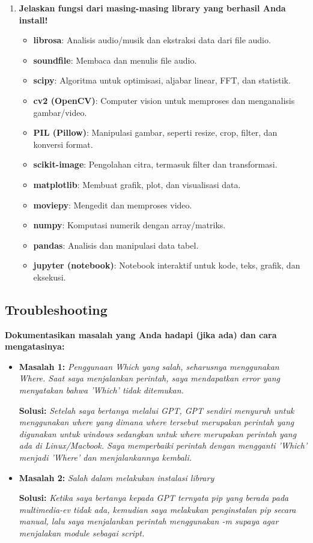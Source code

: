\documentclass[11pt,a4paper]{article}
\begin{document}
\begin{enumerate}
    \item \textbf{Jelaskan fungsi dari masing-masing library yang berhasil Anda install!}
    \begin{itemize}
    \item \textbf{librosa}: Analisis audio/musik dan ekstraksi data dari file audio.
    \item \textbf{soundfile}: Membaca dan menulis file audio.
    \item \textbf{scipy}: Algoritma untuk optimisasi, aljabar linear, FFT, dan statistik.
    \item \textbf{cv2 (OpenCV)}: Computer vision untuk memproses dan menganalisis gambar/video.
    \item \textbf{PIL (Pillow)}: Manipulasi gambar, seperti resize, crop, filter, dan konversi format.
    \item \textbf{scikit-image}: Pengolahan citra, termasuk filter dan transformasi.
    \item \textbf{matplotlib}: Membuat grafik, plot, dan visualisasi data.
    \item \textbf{moviepy}: Mengedit dan memproses video.
    \item \textbf{numpy}: Komputasi numerik dengan array/matriks.
    \item \textbf{pandas}: Analisis dan manipulasi data tabel.
    \item \textbf{jupyter (notebook)}: Notebook interaktif untuk kode, teks, grafik, dan eksekusi.
\end{itemize}

\end{enumerate}

\subsection{Troubleshooting}
\textbf{Dokumentasikan masalah yang Anda hadapi (jika ada) dan cara mengatasinya:}

\begin{itemize}
    \item \textbf{Masalah 1:} \textit{Penggunaan Which yang salah, seharusnya menggunakan Where. Saat saya menjalankan perintah, saya mendapatkan error yang menyatakan bahwa 'Which' tidak ditemukan.}
    
    \textbf{Solusi:} \textit{Setelah saya bertanya melalui GPT, GPT sendiri menyuruh untuk menggunakan where yang dimana where tersebut merupakan perintah yang digunakan untuk windows sedangkan untuk where merupakan perintah yang ada di Linux/Macbook. Saya memperbaiki perintah dengan mengganti 'Which' menjadi 'Where' dan menjalankannya kembali.}
    
    \item \textbf{Masalah 2:} \textit{Salah dalam melakukan instalasi library}
    
    \textbf{Solusi:} \textit{Ketika saya bertanya kepada GPT ternyata pip yang berada pada multimedia-ev tidak ada, kemudian saya melakukan penginstalan pip secara manual, lalu saya menjalankan perintah menggunakan -m supaya agar menjalakan module sebagai script.}
\end{itemize}
\end{document}
